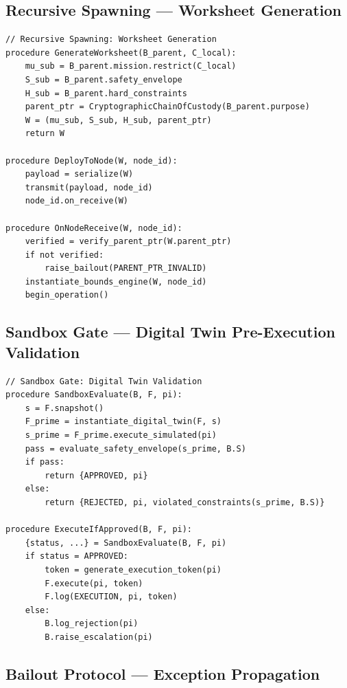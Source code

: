 \documentclass[12pt]{article}
\begin{document}
\subsection{Recursive Spawning — Worksheet Generation}

\begin{verbatim}
// Recursive Spawning: Worksheet Generation
procedure GenerateWorksheet(B_parent, C_local):
    mu_sub = B_parent.mission.restrict(C_local)
    S_sub = B_parent.safety_envelope
    H_sub = B_parent.hard_constraints
    parent_ptr = CryptographicChainOfCustody(B_parent.purpose)
    W = (mu_sub, S_sub, H_sub, parent_ptr)
    return W

procedure DeployToNode(W, node_id):
    payload = serialize(W)
    transmit(payload, node_id)
    node_id.on_receive(W)

procedure OnNodeReceive(W, node_id):
    verified = verify_parent_ptr(W.parent_ptr)
    if not verified:
        raise_bailout(PARENT_PTR_INVALID)
    instantiate_bounds_engine(W, node_id)
    begin_operation()
\end{verbatim}

\subsection{Sandbox Gate — Digital Twin Pre-Execution Validation}

\begin{verbatim}
// Sandbox Gate: Digital Twin Validation
procedure SandboxEvaluate(B, F, pi):
    s = F.snapshot()
    F_prime = instantiate_digital_twin(F, s)
    s_prime = F_prime.execute_simulated(pi)
    pass = evaluate_safety_envelope(s_prime, B.S)
    if pass:
        return {APPROVED, pi}
    else:
        return {REJECTED, pi, violated_constraints(s_prime, B.S)}

procedure ExecuteIfApproved(B, F, pi):
    {status, ...} = SandboxEvaluate(B, F, pi)
    if status = APPROVED:
        token = generate_execution_token(pi)
        F.execute(pi, token)
        F.log(EXECUTION, pi, token)
    else:
        B.log_rejection(pi)
        B.raise_escalation(pi)
\end{verbatim}

\subsection{Bailout Protocol — Exception Propagation}
\end{document}

